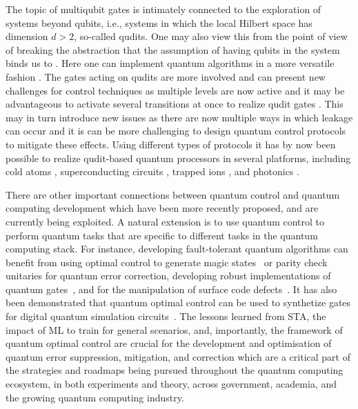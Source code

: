 The topic of multiqubit gates is intimately connected to the exploration of systems beyond qubits, i.e., systems in which the local Hilbert space has dimension $d>2$, so-called qudits. One may also view this from the point of view of breaking the abstraction that the assumption of having qubits in the system binds us to \cite{shi2020resource}. 
Here one can implement quantum algorithms in a more versatile fashion \cite{wang2020qudits,rasmussen2020reducing}. The gates acting on qudits are more involved and can present new challenges for control techniques as multiple levels are now active and it may be advantageous to activate several transitions at once to realize qudit gates \cite{baekkegaard2019realization,shi2020resource}. This may in turn introduce new issues as there are now multiple ways in which leakage can occur and it is can be more challenging to design quantum control protocols to mitigate these effects.
Using different types of protocols it has by now been possible to realize qudit-based quantum processors in several platforms, including cold atoms \cite{davis2019photon}, superconducting circuits \cite{blok2021quantum}, trapped ions \cite{ringbauer2022universal}, and photonics \cite{reimer2019high,chi2022programmable}.


There are other important connections between quantum control and quantum computing development which have been more recently proposed, and are currently being exploited. A natural extension is to use quantum control to perform quantum tasks that are specific to different tasks in the quantum computing stack. For instance, developing fault-tolerant quantum algorithms can benefit from using optimal control to generate magic states~\cite{omanakuttan2024} or parity check unitaries \cite{lewis2024} for quantum error correction, developing robust implementations of quantum gates~\cite{CarolanPRA2023}, and for the manipulation of surface code defects~\cite{raii2024}. It has also been demonstrated that quantum optimal control can be used to synthetize gates for digital quantum simulation circuits~\cite{lysne2020,kairys2021}. The lessons learned from STA, the impact of ML to train for general scenarios, and, importantly, the framework of quantum optimal control are crucial for the development and optimisation of quantum error suppression, mitigation, and correction which are a critical part of the strategies and roadmaps being pursued throughout the quantum computing ecosystem, in both experiments and theory, across government, academia, and the growing quantum computing industry.

